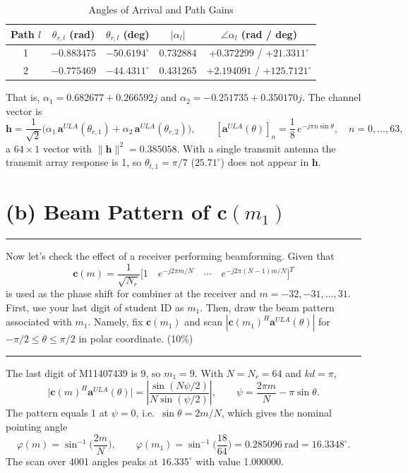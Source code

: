 \documentclass[12pt,a4paper]{report}
\newcommand{\question}[1]{%
    \hrule
    \vspace{0.2cm}
    #1
    \vspace{0.2cm}
    \hrule
    \vspace{0.5cm}
}
\begin{document}
\begin{table}[H]
\centering
\caption{Angles of Arrival and Path Gains}
\setlength{\tabcolsep}{10pt}
\renewcommand{\arraystretch}{1.2}
\begin{tabular}{ccccc}
\toprule
Path $l$ & $\theta_{r,l}$ (rad) & $\theta_{r,l}$ (deg) & $|\alpha_l|$ & $\angle\alpha_l$ (rad / deg) \\
\midrule
1 & $-0.883475$ & $-50.6194^\circ$ & 0.732884 & $+0.372299$ / $+21.3311^\circ$ \\
2 & $-0.775469$ & $-44.4311^\circ$ & 0.431265 & $+2.194091$ / $+125.7121^\circ$ \\
\bottomrule
\end{tabular}
\end{table}

That is, $\alpha_1 = 0.682677 + 0.266592j$ and $\alpha_2 = -0.251735 + 0.350170j$. The channel vector is
\begin{equation}
    \mathbf{h} = \frac{1}{\sqrt 2}\big(\alpha_1\,\mathbf{a}^{ULA}(\theta_{r,1}) + \alpha_2\,\mathbf{a}^{ULA}(\theta_{r,2})\big),
    \qquad [\mathbf{a}^{ULA}(\theta)]_n = \frac{1}{8}\,e^{-j\pi n\sin\theta},\quad n = 0, \ldots, 63,
\end{equation}
a $64 \times 1$ vector with $\|\mathbf{h}\|^2 = 0.385058$. With a single transmit antenna the transmit array response
is 1, so $\theta_{t,1} = \pi/7$ ($25.71^\circ$) does not appear in $\mathbf{h}$.

\section{(b) Beam Pattern of $\mathbf{c}(m_1)$}

\question{Now let's check the effect of a receiver performing beamforming. Given that
\[ \mathbf{c}(m) = \frac{1}{\sqrt{N_r}}\big[1 \quad e^{-j2\pi m/N} \quad \cdots \quad e^{-j2\pi(N-1)m/N}\big]^T \]
is used as the phase shift for combiner at the receiver and $m = -32, -31, \ldots, 31$. First, use your last digit of
student ID as $m_1$. Then, draw the beam pattern associated with $m_1$. Namely, fix $\mathbf{c}(m_1)$ and scan
$|\mathbf{c}(m_1)^H\mathbf{a}^{ULA}(\theta)|$ for $-\pi/2 \le \theta \le \pi/2$ in polar coordinate. (10\%)}

The last digit of M11407439 is 9, so $m_1 = 9$. With $N = N_r = 64$ and $kd = \pi$,
\begin{equation}
    \big|\mathbf{c}(m)^H\mathbf{a}^{ULA}(\theta)\big| = \left|\frac{\sin(N\psi/2)}{N\sin(\psi/2)}\right|, \qquad
    \psi = \frac{2\pi m}{N} - \pi\sin\theta .
\end{equation}
The pattern equals 1 at $\psi = 0$, i.e.\ $\sin\theta = 2m/N$, which gives the nominal pointing angle
\begin{equation}
    \varphi(m) = \sin^{-1}\!\Big(\frac{2m}{N}\Big), \qquad
    \varphi(m_1) = \sin^{-1}\!\Big(\frac{18}{64}\Big) = 0.285096\ \text{rad} = 16.3348^\circ .
\end{equation}
The scan over 4001 angles peaks at $16.335^\circ$ with value 1.000000.
\end{document}
